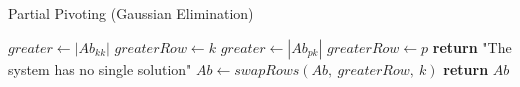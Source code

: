 \documentclass{article}
\begin{document}
  \begin{algorithm}
    \caption{Partial Pivoting (Gaussian Elimination)}
    \begin{algorithmic}[1]
        \State $greater \gets |Ab_{kk}|$
        \State $greaterRow \gets k$
            \State $greater \gets |Ab_{pk}|$
            \State $greaterRow \gets p$
          \EndIf
        \EndFor
          \State \textbf{return} "The system has no single solution"
        \Else
            \State $Ab \gets swapRows(Ab,\ greaterRow,\ k)$
          \EndIf
          \State \textbf{return} $Ab$
        \EndIf
      \EndProcedure
    \end{algorithmic}
  \end{algorithm}
\end{document}
